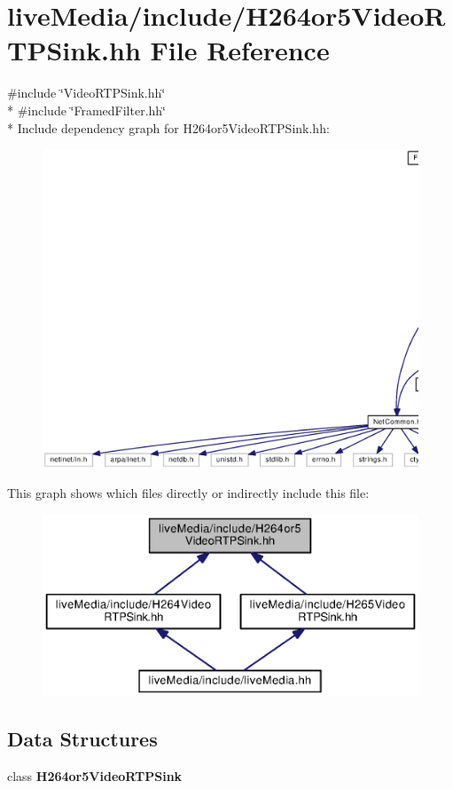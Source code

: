 \section{live\+Media/include/\+H264or5\+Video\+R\+T\+P\+Sink.hh File Reference}
\label{H264or5VideoRTPSink_8hh}
{\ttfamily \#include \char`\"{}Video\+R\+T\+P\+Sink.\+hh\char`\"{}}\\*
{\ttfamily \#include \char`\"{}Framed\+Filter.\+hh\char`\"{}}\\*
Include dependency graph for H264or5\+Video\+R\+T\+P\+Sink.\+hh\+:
\nopagebreak
\begin{figure}[H]
\begin{center}
\leavevmode
\includegraphics[width=350pt]{H264or5VideoRTPSink_8hh__incl}
\end{center}
\end{figure}
This graph shows which files directly or indirectly include this file\+:
\nopagebreak
\begin{figure}[H]
\begin{center}
\leavevmode
\includegraphics[width=350pt]{H264or5VideoRTPSink_8hh__dep__incl}
\end{center}
\end{figure}
\subsection*{Data Structures}
\begin{DoxyCompactItemize}
\item 
class {\bf H264or5\+Video\+R\+T\+P\+Sink}
\end{DoxyCompactItemize}
